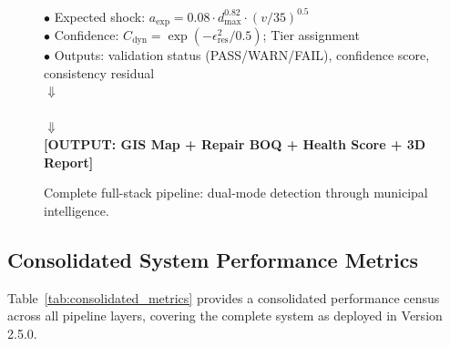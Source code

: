 \begin{figure}[htbp]
\begin{tcolorbox}[colback=gray!5,colframe=gray!50,arc=1mm,title=\textbf{Full-Stack Architecture: Raw Pixels $\to$ Municipal GIS Intelligence}]
\begin{center}
{{$\bullet$ Expected shock: $a_{\text{exp}} = 0.08 \cdot d_{\max}^{0.82} \cdot (v/35)^{0.5}$ \\
$\bullet$ Confidence: $C_{\text{dyn}} = \exp(-\epsilon_{\text{res}}^2 / 0.5)$; Tier assignment \\
$\bullet$ Outputs: validation status (PASS/WARN/FAIL), confidence score, consistency residual}} \\
$\Downarrow$ \\
 \\
$\Downarrow$ \\
\textbf{[OUTPUT: GIS Map + Repair BOQ + Health Score + 3D Report]}
\end{center}
\end{tcolorbox}
\caption{Complete full-stack pipeline: dual-mode detection through municipal intelligence.}
\label{fig:full_stack_architecture}
\end{figure}

\subsection{Consolidated System Performance Metrics}

Table~\ref{tab:consolidated_metrics} provides a consolidated performance census across all pipeline layers, covering the complete system as deployed in Version 2.5.0.

